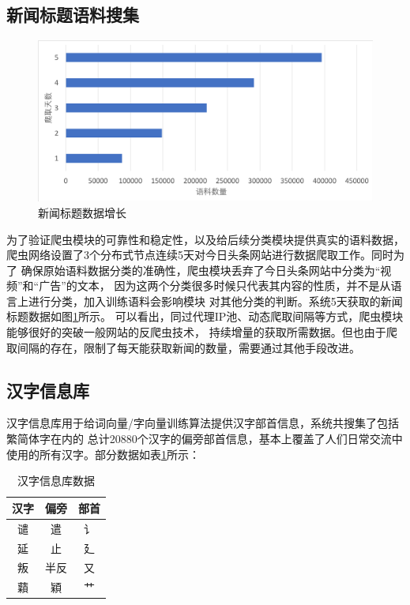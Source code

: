 \subsection{新闻标题语料搜集}
\begin{figure}[!hbp]
    \includegraphics[scale=0.5]{picture/spider_data.png}
    \caption{新闻标题数据增长}
    \label{spider_data_chart}
\end{figure}
为了验证爬虫模块的可靠性和稳定性，以及给后续分类模块提供真实的语料数据，
爬虫网络设置了3个分布式节点连续5天对今日头条网站进行数据爬取工作。同时为了
确保原始语料数据分类的准确性，爬虫模块丢弃了今日头条网站中分类为“视频”和“广告”的文本，
因为这两个分类很多时候只代表其内容的性质，并不是从语言上进行分类，加入训练语料会影响模块
对其他分类的判断。系统5天获取的新闻标题数据如图\ref{spider_data_chart}所示。
可以看出，同过代理IP池、动态爬取间隔等方式，爬虫模块能够很好的突破一般网站的反爬虫技术，
持续增量的获取所需数据。但也由于爬取间隔的存在，限制了每天能获取新闻的数量，需要通过其他手段改进。
\subsection{汉字信息库}
汉字信息库用于给词向量/字向量训练算法提供汉字部首信息，系统共搜集了包括繁简体字在内的
总计20880个汉字的偏旁部首信息，基本上覆盖了人们日常交流中使用的所有汉字。部分数据如表\ref{comp_table}所示：
\begin{table}[h]
    \caption{汉字信息库数据}
    \begin{tabular}{|c|c|c|}
        \hline
        汉字 & 偏旁 & 部首 \\
        \hline
        谴 & 遣 & 讠 \\
        \hline
        延 & 止 & 廴 \\
        \hline
        叛 & 半反 & 又 \\
        \hline
        蘔 & 穎 & 艹 \\
        \hline
    \end{tabular}
    \label{comp_table}
    \end{table}
